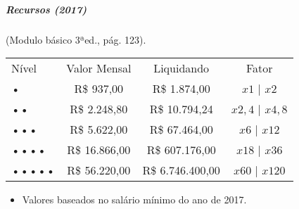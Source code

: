 \subparagraph{\bf Recursos (2017)}(Modulo básico 3ªed., pág. 123).

\begin{table}[!htpb]
\centering
\label{Recursos}
\begin{tabular}{|l c c c|}
\hline
Nível   &	Valor Mensal	& Liquidando		& Fator\\
\rowcolor[HTML]{EFEFEF} 
•		& 	R\$ 937,00		& R\$ 1.874,00		& $x1$ | $x2$\\
••		& 	R\$ 2.248,80	& R\$ 10.794,24		& $x2,4$ | $x4,8$\\
\rowcolor[HTML]{EFEFEF} 
•••		&	R\$ 5.622,00	& R\$ 67.464,00		& $x6$ | $x12$\\
••••	&	R\$ 16.866,00	& R\$ 607.176,00	& $x18$ | $x36$\\
\rowcolor[HTML]{EFEFEF} 
•••••	&	R\$ 56.220,00	& R\$ 6.746.400,00	& $x60$ | $x120$\\
\hline
\end{tabular}
\end{table}

\begin{itemize}[noitemsep]
\item Valores baseados no salário mínimo do ano de 2017.
\end{itemize}